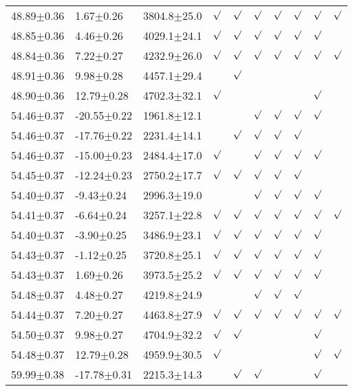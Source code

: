 \begin{table}[h]
\begin{center}
\begin{tabular}{llllllllll}
48.89$\pm$0.36 & 1.67$\pm$0.26 & 3804.8$\pm$25.0& $\surd$ & $\surd$ & $\surd$ & $\surd$ & $\surd$ & $\surd$ & $\surd$ \\
48.85$\pm$0.36 & 4.46$\pm$0.26 & 4029.1$\pm$24.1& $\surd$ & $\surd$ & $\surd$ & $\surd$ & $\surd$ & $\surd$ & \\
48.84$\pm$0.36 & 7.22$\pm$0.27 & 4232.9$\pm$26.0& $\surd$ & $\surd$ & $\surd$ & $\surd$ & $\surd$ & $\surd$ & $\surd$ \\
48.91$\pm$0.36 & 9.98$\pm$0.28 & 4457.1$\pm$29.4& & $\surd$ & & & & & \\
48.90$\pm$0.36 & 12.79$\pm$0.28 & 4702.3$\pm$32.1& $\surd$ & & & & & $\surd$ & \\
54.46$\pm$0.37 & -20.55$\pm$0.22 & 1961.8$\pm$12.1& & & $\surd$ & $\surd$ & $\surd$ & $\surd$ & \\
54.46$\pm$0.37 & -17.76$\pm$0.22 & 2231.4$\pm$14.1& & $\surd$ & $\surd$ & $\surd$ & $\surd$ & & \\
54.46$\pm$0.37 & -15.00$\pm$0.23 & 2484.4$\pm$17.0& $\surd$ & & $\surd$ & $\surd$ & $\surd$ & $\surd$ & \\
54.45$\pm$0.37 & -12.24$\pm$0.23 & 2750.2$\pm$17.7& $\surd$ & $\surd$ & $\surd$ & $\surd$ & $\surd$ & & \\
54.40$\pm$0.37 & -9.43$\pm$0.24 & 2996.3$\pm$19.0& & & $\surd$ & $\surd$ & $\surd$ & $\surd$ & \\
54.41$\pm$0.37 & -6.64$\pm$0.24 & 3257.1$\pm$22.8& $\surd$ & $\surd$ & $\surd$ & $\surd$ & $\surd$ & $\surd$ & $\surd$ \\
54.40$\pm$0.37 & -3.90$\pm$0.25 & 3486.9$\pm$23.1& $\surd$ & $\surd$ & $\surd$ & $\surd$ & $\surd$ & $\surd$ & \\
54.43$\pm$0.37 & -1.12$\pm$0.25 & 3720.8$\pm$25.1& $\surd$ & $\surd$ & $\surd$ & $\surd$ & $\surd$ & $\surd$ & \\
54.43$\pm$0.37 & 1.69$\pm$0.26 & 3973.5$\pm$25.2& $\surd$ & $\surd$ & $\surd$ & $\surd$ & $\surd$ & $\surd$ & \\
54.48$\pm$0.37 & 4.48$\pm$0.27 & 4219.8$\pm$24.9& & & $\surd$ & $\surd$ & $\surd$ & & \\
54.44$\pm$0.37 & 7.20$\pm$0.27 & 4463.8$\pm$27.9& $\surd$ & $\surd$ & $\surd$ & $\surd$ & $\surd$ & $\surd$ & $\surd$ \\
54.50$\pm$0.37 & 9.98$\pm$0.27 & 4704.9$\pm$32.2& $\surd$ & $\surd$ & & & & $\surd$ & \\
54.48$\pm$0.37 & 12.79$\pm$0.28 & 4959.9$\pm$30.5& $\surd$ & & & & & $\surd$ & $\surd$ \\
59.99$\pm$0.38 & -17.78$\pm$0.31 & 2215.3$\pm$14.3& & $\surd$ & $\surd$ & & & $\surd$ & \\

\end{tabular}
\end{center}
\end{table}
